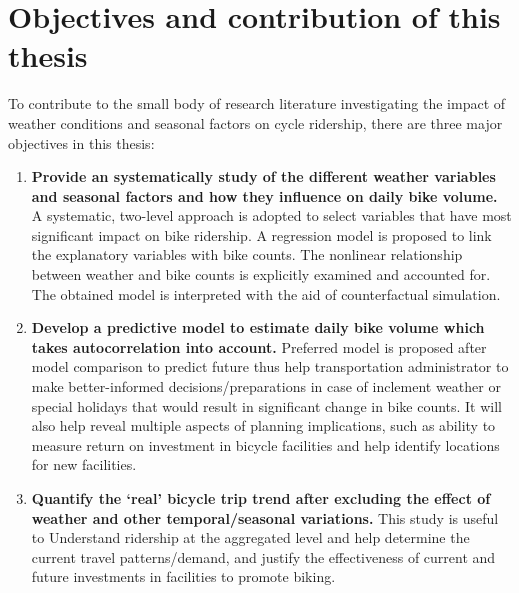 \documentclass [11pt, proquest] {uwthesis}[2015/03/03]
\begin{document}
\section{Objectives and contribution of this thesis}
To contribute to the small body of research literature investigating the impact of weather conditions and seasonal factors on cycle ridership, there are three major objectives in this thesis:
\begin{enumerate}
\item \textbf{Provide an systematically study of the different weather variables and seasonal factors and how they influence on daily bike volume.} A systematic, two-level approach is adopted to select variables that have most significant impact on bike ridership. A regression model is proposed to link the explanatory variables with bike counts. The nonlinear relationship between weather and bike counts is explicitly examined and accounted for. The obtained model is interpreted with the aid of counterfactual simulation. 
\item \textbf{Develop a predictive model to estimate daily bike volume which takes autocorrelation into account.} Preferred model is proposed after model comparison to predict future thus help transportation administrator to make better-informed decisions/preparations in case of inclement weather or special holidays that would result in significant change in bike counts. It will also help reveal multiple aspects of planning implications, such as ability to measure return on investment in bicycle facilities and help identify locations for new facilities. 
\item \textbf{Quantify the `real' bicycle trip trend after excluding the effect of weather and other temporal/seasonal variations.} This study is useful to Understand ridership at the aggregated level and help determine the current travel patterns/demand, and justify the effectiveness of current and future investments in facilities to promote biking.
\end{enumerate}
\end{document}
